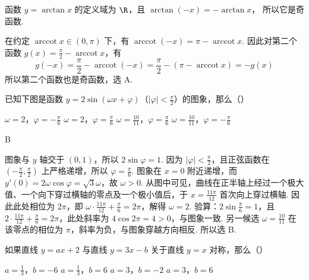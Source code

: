 \documentclass[UTF8,a4paper,oneside,11pt]{ctexbook}
\begin{document}
\begin{solution}
函数 \(y=\arctan x\) 的定义域为 \(\R\)，且
\(\arctan(-x)=-\arctan x\)，
所以它是奇函数.

在约定 \(\operatorname{arccot}x\in(0,\pi)\) 下，有
\(\operatorname{arccot}(-x)=\pi-\operatorname{arccot}x\).
因此对第二个函数 \(g(x)=\frac{\pi}{2}-\operatorname{arccot}x\)，有
\[
g(-x)=\frac{\pi}{2}-\operatorname{arccot}(-x)
=\frac{\pi}{2}-\left(\pi-\operatorname{arccot}x\right)
=-g(x)
\]
所以第二个函数也是奇函数，选 A.
\end{solution}

\begin{problem}
已知下图是函数 \(y=2\sin\left( \omega x+\varphi \right)\)（\(\left| \varphi \right|<\frac{\pi}{2}\)）的图象，那么（\quad）


\choices
    {\(\omega=2\)，\(\varphi=-\frac{\pi}{6}\)}
    {\(\omega=2\)，\(\varphi=\frac{\pi}{6}\)}
    {\(\omega=\frac{10}{11}\)，\(\varphi=\frac{\pi}{6}\)}
    {\(\omega=\frac{10}{11}\)，\(\varphi=-\frac{\pi}{6}\)}
\end{problem}

\begin{answer}
B
\end{answer}

\begin{solution}
图象与 \(y\) 轴交于 \(\left(0,1\right)\)，所以 \(2\sin\varphi=1\). 因为 \(\left|\varphi\right|<\frac{\pi}{2}\)，且正弦函数在 \(\left(-\frac{\pi}{2},\frac{\pi}{2}\right)\) 上严格递增，所以 \(\varphi=\frac{\pi}{6}\). 图象在 \(x=0\) 附近递增，而 \(y'(0)=2\omega\cos\varphi=\sqrt{3}\omega\)，故 \(\omega>0\). 从图中可见，曲线在正半轴上经过一个极大值、一个向下穿过横轴的零点及一个极小值后，于 \(x=\frac{11\pi}{12}\) 首次向上穿过横轴. 因此此处相位为 \(2\pi\)，即 \(\omega\cdot\frac{11\pi}{12}+\frac{\pi}{6}=2\pi\)，解得 \(\omega=2\). 验算：\(2\sin\frac{\pi}{6}=1\)，且 \(2\cdot\frac{11\pi}{12}+\frac{\pi}{6}=2\pi\)，此处斜率为 \(4\cos2\pi=4>0\)，与图象一致. 另一候选 \(\omega=\frac{10}{11}\) 在该零点的相位为 \(\pi\)，斜率为负，与图象穿越方向相反. 所以选 B.
\end{solution}

\begin{problem}
如果直线 \(y=ax+2\) 与直线 \(y=3x-b\) 关于直线 \(y=x\) 对称，那么（\quad）

\choices
    {\(a=\frac{1}{3}\)，\(b=-6\)}
    {\(a=\frac{1}{3}\)，\(b=6\)}
    {\(a=3\)，\(b=-2\)}
    {\(a=3\)，\(b=6\)}
\end{problem}
\end{document}
